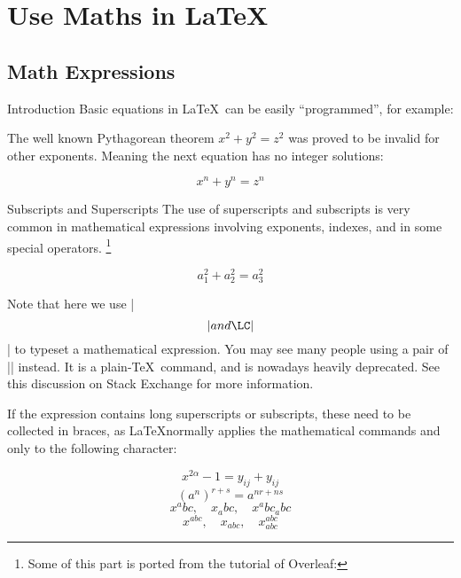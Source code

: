\section{Use Maths in \LaTeX}

\subsection{Math Expressions}

\begin{frame}[fragile]{Introduction}
Basic equations in \LaTeX\ can be easily ``programmed'', for example: 
\begin{latexexample}
The well known Pythagorean theorem \(x^2 + y^2 = z^2\) was 
proved to be invalid for other exponents. 
Meaning the next equation has no integer solutions:

\[ x^n + y^n = z^n \]
\end{latexexample}
\end{frame}

\begin{frame}[fragile]{Subscripts and Superscripts}
The use of superscripts and subscripts is very common in mathematical expressions involving exponents, indexes, and in some special operators. \footnote[1]{Some of this part is ported from the tutorial of Overleaf: }

\begin{latexexamplesplit}
\[ a_1^2 + a_2^2 = a_3^2 \]
\end{latexexamplesplit}

\pause

Note that here we use \LC|\[| and \LC|\]| to typeset a mathematical expression.
You may see many people using a pair of \LC|$$| instead. It is a plain-\TeX\ command, and is nowadays heavily deprecated. See this discussion  on Stack Exchange for more information. 

\end{frame}

\begin{frame}[fragile]

If the expression contains long superscripts or subscripts, these need to be collected in braces, as \LaTeX normally applies the mathematical commands \LC{^} and \LC{_} only to the following character:

\pause

\begin{latexexamplesplit}
\[ x^{2 \alpha} - 1 = y_{ij} + y_{ij}  \]
\[ (a^n)^{r+s} = a^{nr+ns}  \]
\[ x^abc, \quad x_abc, \quad x^abc_abc \]
\[ x^{abc}, \quad x_{abc}, \quad x^{abc}_{abc} \]
\end{latexexamplesplit}

\end{frame}

